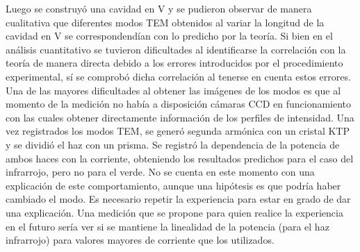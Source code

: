 \documentclass[10pt, a4paper]{article}%
\begin{document}
\begin{multicols}{2}
Luego se construyó una cavidad en V y se pudieron observar de manera cualitativa que diferentes modos TEM obtenidos al variar la longitud de la cavidad en V se correspondendían con lo predicho por la teoría. Si bien en el análisis cuantitativo se tuvieron dificultades al identificarse la correlación con la teoría de manera directa debido a los errores introducidos por el procedimiento experimental, sí se comprobó dicha correlación al tenerse en cuenta  estos errores. Una de las mayores dificultades al obtener las imágenes de los modos es que al momento de la medición no había a disposición cámaras CCD en funcionamiento con las cuales obtener directamente información de los perfiles de intensidad. Una vez registrados los modos TEM, se generó segunda armónica con un cristal KTP y se dividió el haz con un prisma. Se registró la dependencia de la potencia de ambos haces con la corriente, obteniendo los resultados predichos para el caso del infrarrojo, pero no para el verde. No se cuenta en este momento con una explicación de este comportamiento, aunque una hipótesis es que podría haber cambiado el modo. Es necesario repetir la experiencia para estar en grado de dar una explicación. Una medición que se propone para quien realice la experiencia en el futuro sería ver si se mantiene la linealidad de la potencia (para el haz infrarrojo) para valores mayores de corriente que los utilizados.







\begin{thebibliography}{100}
\end{thebibliography}
\end{multicols}
\end{document}
